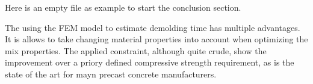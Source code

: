 Here is an empty file as example to start the conclusion section.


The using the FEM model to estimate demolding time has multiple advantages.
It is allows to take changing material properties into account when optimizing the mix properties.
The applied constraint, although quite crude, show the improvement over a priory defined compressive strength requirement, as is the state of the art for mayn precast concrete manufacturers.
